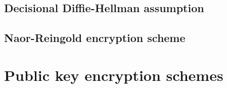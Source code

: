 
\subsection{Decisional Diffie-Hellman assumption}


\subsection{Naor-Reingold encryption scheme}


\section{Public key encryption schemes}

